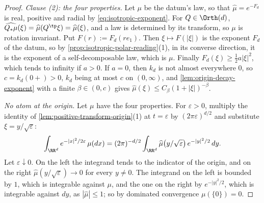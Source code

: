 \begin{proof}
\emph{Clause (2): the four properties.} Let $\mu$ be the datum's law, so that
$\widehat\mu = e^{-F_d}$ is real, positive and radial by \ref{eq:isotropic-exponent}. For
$Q \in \Orth(d)$, $\widehat{Q_*\mu}(\xi) = \widehat\mu(Q^{\tp}\xi) = \widehat\mu(\xi)$, and a law is
determined by its transform, so $\mu$ is rotation invariant. Put $F(r) := F_d(re_1)$. Then
$\xi \mapsto F(|\xi|)$ is the exponent $F_d$ of the datum, so by
\ref{prop:isotropic-polar-reading}(1), in its converse direction, it is the exponent of a
self-decomposable law, which is $\mu$. Finally $F_d(\xi) \ge \tfrac12 a|\xi|^2$, which tends to
infinity if $a > 0$. If $a = 0$, then $k_d$ is not almost everywhere $0$, so
$c = k_d(0{+}) > 0$, $k_d$ being at most $c$ on $(0,\infty)$, and
\ref{lem:origin-decay-exponent} with a finite $\beta \in (0,c)$ gives
$\widehat\mu(\xi) \le C_\beta(1+|\xi|)^{-\beta}$.

\emph{No atom at the origin.} Let $\mu$ have the four properties. For $\varepsilon > 0$, multiply
the identity of \ref{lem:positive-transform-origin}(1) at $t = \varepsilon$ by
$(2\pi\varepsilon)^{d/2}$ and substitute $\xi = y/\sqrt\varepsilon$:
\[
  \int_{\RR^d} e^{-|x|^2/2\varepsilon}\,\mu(dx)
   = (2\pi)^{-d/2}\int_{\RR^d}\widehat\mu\bigl(y/\sqrt\varepsilon\bigr)\,e^{-|y|^2/2}\,dy .
\]
Let $\varepsilon \downarrow 0$. On the left the integrand tends to the indicator of the origin, and
on the right $\widehat\mu(y/\sqrt\varepsilon) \to 0$ for every $y \ne 0$. The integrand on the left is bounded
by $1$, which is integrable against $\mu$, and the one on the right by $e^{-|y|^2/2}$, which is
integrable against $dy$, as $|\widehat\mu| \le 1$; so by dominated convergence $\mu(\{0\}) = 0$.


\end{proof}
